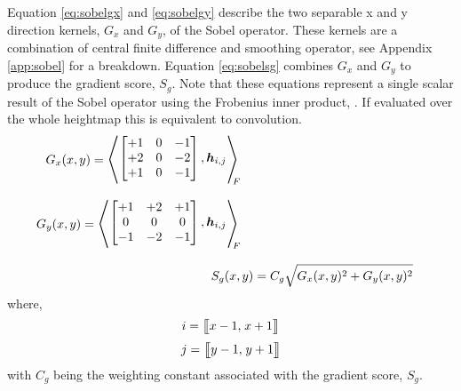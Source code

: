         \newpage
        \noindent
        Equation \ref{eq:sobelgx} and \ref{eq:sobelgy} describe the two separable x and y direction kernels, \(G_x\) and \(G_y\),
        of the Sobel operator. These kernels are a combination of central finite difference and smoothing operator, see Appendix \ref{app:sobel} 
        for a breakdown. Equation \ref{eq:sobelsg} combines \(G_x\) and \(G_y\) to produce the gradient score, \(S_g\). Note that these equations represent
        a single scalar result of the Sobel operator using the Frobenius inner product, \cite{horn2012matrix}. If evaluated over the whole heightmap this is equivalent
        to convolution.
        \begin{align}
            \begin{split} \label{eq:sobelgx}
                G_x(x,y) &= 
                        \sbox0{$
                        \begin{bmatrix}
                            +1 & 0 & -1\\
                            +2 & 0 & -2\\
                            +1 & 0 & -1
                        \end{bmatrix}
                        ,\boldsymbol{h}_{i,j}
                        $}
                        \mathopen{\resizebox{1.2\width}{1.1\ht0}{$\Bigg\langle$}}
                        \raisebox{0.08\ht0}{\usebox{0}}
                        \mathclose{\resizebox{1.2\width}{1.1\ht0}{$\Bigg\rangle$}}_{\mkern-10mu F}
            \end{split}\\[0.3cm]
            \begin{split} \label{eq:sobelgy}
                G_y(x,y) &= 
                        \sbox0{$
                        \begin{bmatrix}
                            +1 & +2 & +1\\
                            0 & 0 & 0\\
                            -1 & -2 & -1
                        \end{bmatrix}
                        ,\boldsymbol{h}_{i,j}
                        $}
                        \mathopen{\resizebox{1.2\width}{1.1\ht0}{$\Bigg\langle$}}
                        \raisebox{0.08\ht0}{\usebox{0}}
                        \mathclose{\resizebox{1.2\width}{1.1\ht0}{$\Bigg\rangle$}}_{\mkern-10mu F}
            \end{split}\\[0.3cm]
            S_g(x,y) &= C_g\sqrt{G_x(x,y)^2 + G_y(x,y)^2} \label{eq:sobelsg}
        \end{align}
        where,
        \[i = \big[\mkern-4.7mu\big[x-1,\mkern2mu x+1\big]\mkern-4.7mu\big]\]
        \[j = \big[\mkern-4.7mu\big[y-1,\mkern2mu y+1\big]\mkern-4.7mu\big]\]
        \noindent
        with \(C_g\) being the weighting constant associated with the gradient score, \(S_g\).
        
